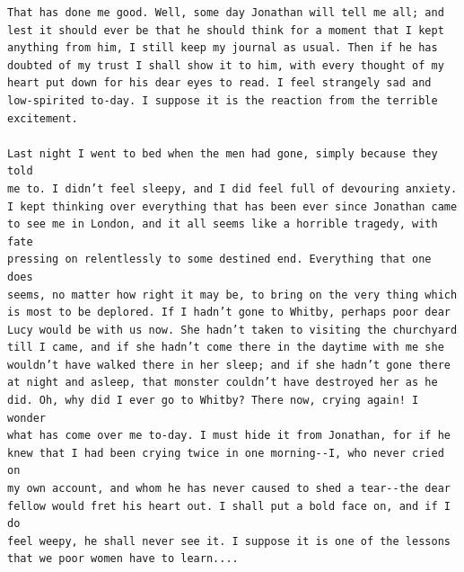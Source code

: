 \documentclass{article}
\begin{document}
\begin{verbatim}
That has done me good. Well, some day Jonathan will tell me all; and
lest it should ever be that he should think for a moment that I kept
anything from him, I still keep my journal as usual. Then if he has
doubted of my trust I shall show it to him, with every thought of my
heart put down for his dear eyes to read. I feel strangely sad and
low-spirited to-day. I suppose it is the reaction from the terrible
excitement.

Last night I went to bed when the men had gone, simply because they told
me to. I didn’t feel sleepy, and I did feel full of devouring anxiety.
I kept thinking over everything that has been ever since Jonathan came
to see me in London, and it all seems like a horrible tragedy, with fate
pressing on relentlessly to some destined end. Everything that one does
seems, no matter how right it may be, to bring on the very thing which
is most to be deplored. If I hadn’t gone to Whitby, perhaps poor dear
Lucy would be with us now. She hadn’t taken to visiting the churchyard
till I came, and if she hadn’t come there in the daytime with me she
wouldn’t have walked there in her sleep; and if she hadn’t gone there
at night and asleep, that monster couldn’t have destroyed her as he
did. Oh, why did I ever go to Whitby? There now, crying again! I wonder
what has come over me to-day. I must hide it from Jonathan, for if he
knew that I had been crying twice in one morning--I, who never cried on
my own account, and whom he has never caused to shed a tear--the dear
fellow would fret his heart out. I shall put a bold face on, and if I do
feel weepy, he shall never see it. I suppose it is one of the lessons
that we poor women have to learn....


\end{verbatim}
\end{document}
